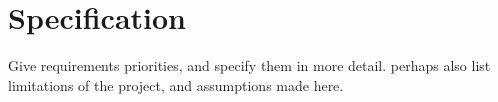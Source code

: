 \chapter*{Specification}

Give requirements priorities, and specify them in more detail.
perhaps also list limitations of the project, and assumptions made here.
